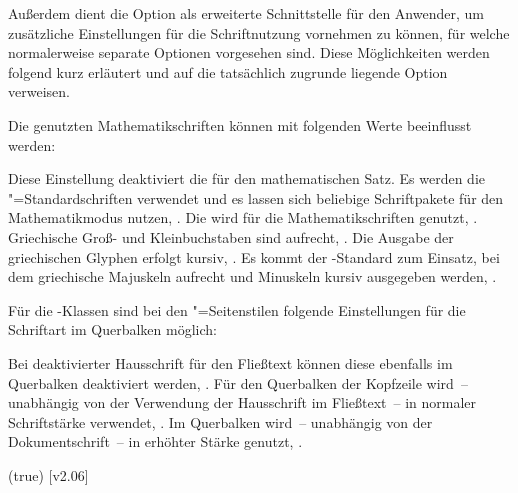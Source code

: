\begin{DeclareEntity*}{}
\begin{DeclareEntity*}{}
\begin{DeclareEntity*}{}
\begin{Declaration}
Außerdem dient die Option  als erweiterte Schnittstelle 
für den Anwender, um zusätzliche Einstellungen für die Schriftnutzung vornehmen 
zu können, für welche normalerweise separate Optionen vorgesehen sind. Diese 
Möglichkeiten werden folgend kurz erläutert und auf die tatsächlich zugrunde 
liegende Option verweisen.

Die genutzten Mathematikschriften können mit folgenden Werte beeinflusst werden:
\begin{DeclareValues}{}
  Diese Einstellung deaktiviert die \OpenSans für den mathematischen Satz. Es 
  werden die "=Standardschriften verwendet und es lassen sich 
  beliebige Schriftpakete für den Mathematikmodus nutzen, 
  .
  Die \OpenSans wird für die Mathematikschriften genutzt, 
  .
  Griechische Groß- und Kleinbuchstaben sind aufrecht, 
  .
  Die Ausgabe der griechischen Glyphen erfolgt kursiv, 
  .
  Es kommt der -Standard zum Einsatz, bei dem griechische 
  Majuskeln aufrecht und Minuskeln kursiv ausgegeben werden, 
  .
\end{DeclareValues}

%
Für die \TUDScript-Klassen sind bei den "=Seitenstilen 
folgende Einstellungen für die Schriftart im Querbalken möglich:
\begin{DeclareValues}{}
  Bei deaktivierter Hausschrift für den Fließtext können diese ebenfalls im 
  Querbalken deaktiviert werden, .
  Für den Querbalken der Kopfzeile wird~-- unabhängig von der Verwendung der 
  Hausschrift im Fließtext~-- \OpenSans in normaler Schriftstärke verwendet, 
  .
  Im Querbalken wird~-- unabhängig von der Dokumentschrift~-- \OpenSans in 
  erhöhter Stärke genutzt, .
\end{DeclareValues}
\end{Declaration}

\begin{Declaration}
  {}
  (true)
  [v2.06]
\printdeclarationlist


\end{Declaration}
\end{DeclareEntity*}
\end{DeclareEntity*}
\end{DeclareEntity*}
